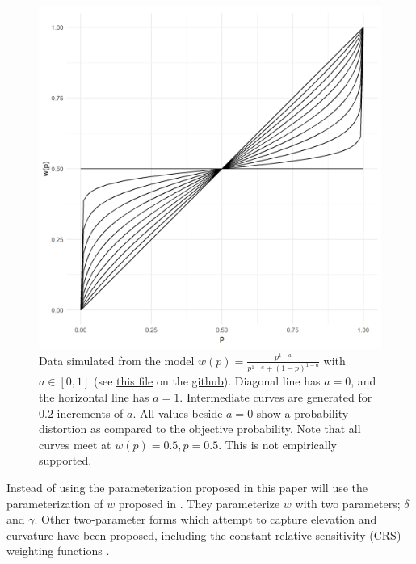 \documentclass[12pt]{article}
\begin{document}
\begin{figure}[H]
	\includegraphics[width = \linewidth]{../Figures/oneParam.png}
	\caption{Data simulated from the model
		$w(p) = \frac{p^{1-a}}
		{p^{1-a}+(1-p)^{1-a}}$ with
		$a \in [0, 1]$ (see
		\href{https://github.com/victor-m-p/BayesianDecisionWeights/blob/main/Code/0_visualize_parameters.Rmd}
		{this file} on the
		\href{https://github.com/victor-m-p/BayesianDecisionWeights}{github}).
		Diagonal line has
		$a = 0$, and the horizontal line
		has $a = 1$. Intermediate curves
		are generated for $0.2$ increments
		of $a$. All values beside
		$a = 0$ show a probability distortion
		as compared to the objective probability.
		Note that all curves meet at
		$w(p) = 0.5, p = 0.5$. This is
	not empirically supported.}
\end{figure}

Instead of using the parameterization
proposed in \textcite{rottenstreich2001money}
this paper will use the parameterization
of $w$ proposed in \textcite{gonzalez1999shape}.
They parameterize $w$ with two parameters;
$\delta$ and $\gamma$. Other two-parameter
forms which attempt to capture elevation and
curvature have been proposed, including the
constant relative sensitivity (CRS) weighting
functions \autocite{abdellaoui2010separating}.

\vspace{3mm}
\end{document}
